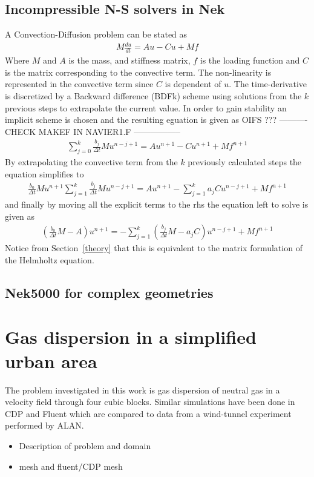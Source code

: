 \subsection{Incompressible N-S solvers in Nek}
A Convection-Diffusion problem can be stated as 
\begin{align}
    M\frac{du}{dt} = Au-Cu+Mf
    \label{eq:conv-diff}
\end{align}
% 
Where $M$ and $A$ is the mass, and stiffness matrix, $f$ is the loading function and $C$ is 
the matrix corresponding to the convective term. The non-linearity is represented in the 
convective term since $C$ is dependent of $u$.
The time-derivative is discretized by a Backward difference (BDFk) scheme using solutions 
from the $k$ previous steps to extrapolate the current value. In order to gain stability 
an implicit scheme is chosen and the resulting eguation is given as 
%
OIFS ???
---------- CHECK MAKEF IN NAVIER1.F ----------------- 
\begin{align}
    \sum_{j=0}^{k}\frac{b_j}{\Delta t}Mu^{n-j+1} = Au^{n+1}-Cu^{n+1}+Mf^{n+1}
    \label{eq:conv-diff}
\end{align}
% 
By extrapolating the convective term from the $k$ previously calculated steps the equation 
simplifies to 
%
\begin{align}
   \frac{b_0}{\Delta t}Mu^{n+1} \sum_{j=1}^{k}\frac{b_j}{\Delta t}Mu^{n-j+1} 
   = Au^{n+1}-\sum_{j=1}^{k}a_jCu^{n-j+1}+Mf^{n+1}
    \label{eq:conv-diff}
\end{align}
% 
and finally by moving all the explicit terms to the rhs the equation left to solve is given as 
%
\begin{align}
   (\frac{b_0}{\Delta t}M-A)u^{n+1} 
   = -\sum_{j=1}^{k}(\frac{b_j}{\Delta t}M-a_jC)u^{n-j+1}+Mf^{n+1}
    \label{eq:conv-diff}
\end{align}
% 
Notice from Section~\ref{theory} that this is equivalent to the matrix formulation of 
the Helmholtz equation.



\subsection{Nek5000 for complex geometries}

\section{Gas dispersion in a simplified urban area}
The problem investigated in this work is gas dispersion of neutral gas in a velocity field through four cubic blocks.
Similar simulations have been done in CDP and Fluent which are compared to data from a wind-tunnel experiment performed by ALAN.
\begin{itemize}
	\item Description of problem and domain
	\item mesh and fluent/CDP mesh
\end{itemize}

